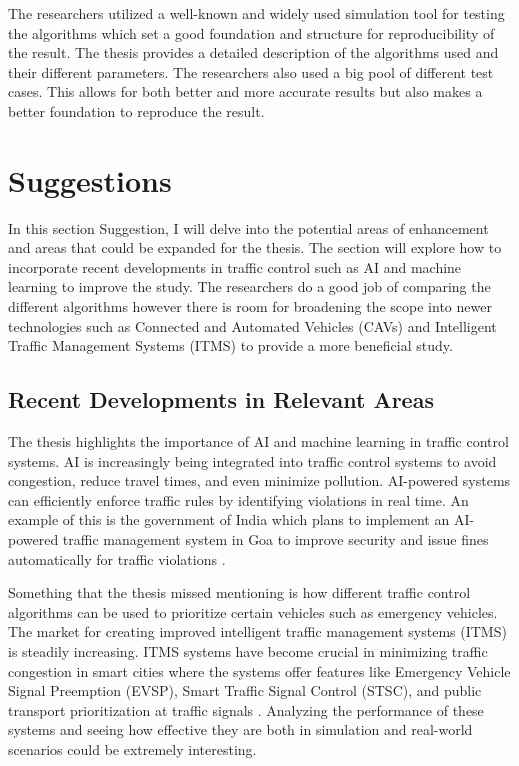 \documentclass[10pt, titlepage]{article}
\begin{document}
The researchers utilized a well-known and widely used simulation tool for testing the algorithms which set a good foundation and structure for reproducibility of the result. The thesis provides a detailed description of the algorithms used and their different parameters. The researchers also used a big pool of different test cases. This allows for both better and more accurate results but also makes a better foundation to reproduce the result.

\newpage
\section{Suggestions}
In this section Suggestion, I will delve into the potential areas of enhancement and areas that could be expanded for the thesis. The section will explore how to incorporate recent developments in traffic control such as AI and machine learning to improve the study. The researchers do a good job of comparing the different algorithms however there is room for broadening the scope into newer technologies such as Connected and Automated Vehicles (CAVs) and Intelligent Traffic Management Systems (ITMS) to provide a more beneficial study.

\subsection{Recent Developments in Relevant Areas} \label{sec:Recent}
The thesis highlights the importance of AI and machine learning in traffic control systems. AI is increasingly being integrated into traffic control systems to avoid congestion, reduce travel times, and even minimize pollution. AI-powered systems can efficiently enforce traffic rules by identifying violations in real time. An example of this is the government of India which plans to implement an AI-powered traffic management system in Goa to improve security and issue fines automatically for traffic violations \cite{Revoluti73:online}.

Something that the thesis missed mentioning is how different traffic control algorithms can be used to prioritize certain vehicles such as emergency vehicles. The market for creating improved intelligent traffic management systems (ITMS) is steadily increasing. ITMS systems have become crucial in minimizing traffic congestion in smart cities where the systems offer features like Emergency Vehicle Signal Preemption (EVSP), Smart Traffic Signal Control (STSC), and public transport prioritization at traffic signals \cite{Intellig10:online}. Analyzing the performance of these systems and seeing how effective they are both in simulation and real-world scenarios could be extremely interesting.
\end{document}

